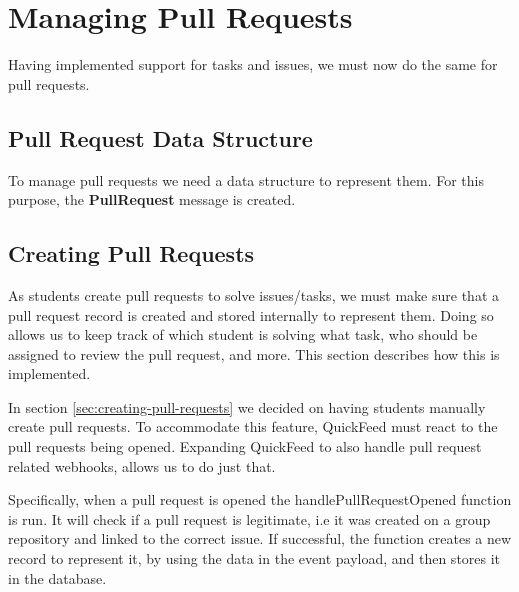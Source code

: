 \section{Managing Pull Requests}

Having implemented support for tasks and issues, we must now do the same for pull requests.

\subsection{Pull Request Data Structure}

To manage pull requests we need a data structure to represent them.
For this purpose, the \textbf{PullRequest} message is created.



\subsection{Creating Pull Requests}

As students create pull requests to solve issues/tasks, we must make sure that a pull request record is created and stored internally to represent them.
Doing so allows us to keep track of which student is solving what task, who should be assigned to review the pull request, and more.
This section describes how this is implemented.

In section \ref{sec:creating-pull-requests} we decided on having students manually create pull requests.
To accommodate this feature, QuickFeed must react to the pull requests being opened.
Expanding QuickFeed to also handle pull request related webhooks, allows us to do just that.

Specifically, when a pull request is opened the handlePullRequestOpened function is run.
It will check if a pull request is legitimate, i.e it was created on a group repository and linked to the correct issue.
If successful, the function creates a new record to represent it, by using the data in the event payload, and then stores it in the database.

